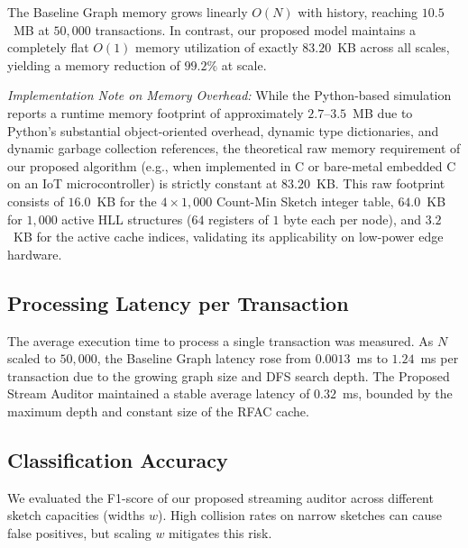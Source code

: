 \documentclass[conference]{IEEEtran}
\begin{document}
The Baseline Graph memory grows linearly $O(N)$ with history, reaching $10.5$~MB at $50,000$ transactions. In contrast, our proposed model maintains a completely flat $O(1)$ memory utilization of exactly $83.20$~KB across all scales, yielding a memory reduction of $99.2\%$ at scale. 

\textit{Implementation Note on Memory Overhead:} While the Python-based simulation reports a runtime memory footprint of approximately $2.7$--$3.5$~MB due to Python's substantial object-oriented overhead, dynamic type dictionaries, and dynamic garbage collection references, the theoretical raw memory requirement of our proposed algorithm (e.g., when implemented in C or bare-metal embedded C on an IoT microcontroller) is strictly constant at $83.20$~KB. This raw footprint consists of $16.0$~KB for the $4 \times 1,000$ Count-Min Sketch integer table, $64.0$~KB for $1,000$ active HLL structures ($64$ registers of $1$ byte each per node), and $3.2$~KB for the active cache indices, validating its applicability on low-power edge hardware.

\subsection{Processing Latency per Transaction}
The average execution time to process a single transaction was measured. As $N$ scaled to $50,000$, the Baseline Graph latency rose from $0.0013$~ms to $1.24$~ms per transaction due to the growing graph size and DFS search depth. The Proposed Stream Auditor maintained a stable average latency of $0.32$~ms, bounded by the maximum depth and constant size of the RFAC cache.

\subsection{Classification Accuracy}
We evaluated the F1-score of our proposed streaming auditor across different sketch capacities (widths $w$). High collision rates on narrow sketches can cause false positives, but scaling $w$ mitigates this risk.
\end{document}
